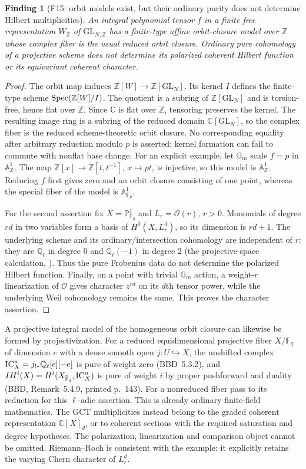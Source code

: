 \documentclass[11pt,a4paper]{article}
\newcommand{\Q}{\mathbb Q}\newcommand{\Z}{\mathbb Z}\newcommand{\C}{\mathbb C}\newcommand{\N}{\mathbb N}\newcommand{\F}{\mathbb F}
\newcommand{\A}{\mathbb A}\newcommand{\PP}{\mathbb P}\newcommand{\GL}{\mathrm{GL}}
\newcommand{\fid}[1]{\textsf{#1}}\newcommand{\gate}[1]{\textsf{#1}}
\theoremstyle{named}\newtheorem{finding}{Finding}[section]
\theoremstyle{definition}\newtheorem{definition}[finding]{Definition}
\theoremstyle{remark}\newtheorem{remark}[finding]{Remark}
\begin{document}
\begin{finding}[\fid{F15}: orbit models exist, but their ordinary purity does not determine Hilbert multiplicities]\label{f:orbit}
An integral polynomial tensor $f$ in a finite free representation $W_\Z$ of $\GL_{N,\Z}$ has a finite-type affine orbit-closure model over $\Z$ whose complex fiber is the usual reduced orbit closure. Ordinary pure cohomology of a projective scheme does not determine its polarized coherent Hilbert function or its equivariant coherent character.
\end{finding}
\begin{proof}
The orbit map induces $\Z[W]\to\Z[\GL_N]$. Its kernel $I$ defines the finite-type scheme $\Spec(\Z[W]/I)$. The quotient is a subring of $\Z[\GL_N]$ and is torsion-free, hence flat over $\Z$. Since $\C$ is flat over $\Z$, tensoring preserves the kernel. The resulting image ring is a subring of the reduced domain $\C[\GL_N]$, so the complex fiber is the reduced scheme-theoretic orbit closure. No corresponding equality after arbitrary reduction modulo $p$ is asserted; kernel formation can fail to commute with nonflat base change. For an explicit example, let $\mathbb G_m$ scale $f=p$ in $\A^1_\Z$. The map $\Z[x]\to\Z[t,t^{-1}]$, $x\mapsto pt$, is injective, so this model is $\A^1_\Z$. Reducing $f$ first gives zero and an orbit closure consisting of one point, whereas the special fiber of the model is $\A^1_{\F_p}$.

For the second assertion fix $X=\PP^1_{\F_q}$ and $L_r=\mathcal O(r)$, $r>0$. Monomials of degree $rd$ in two variables form a basis of $H^0(X,L_r^d)$, so its dimension is $rd+1$. The underlying scheme and its ordinary/intersection cohomology are independent of $r$: they are $\Q_\ell$ in degree 0 and $\Q_\ell(-1)$ in degree 2 (the projective-space calculation, \cite[Example 16.3, p.~109]{Milne}). Thus the pure Frobenius data do not determine the polarized Hilbert function. Finally, on a point with trivial $\mathbb G_m$ action, a weight-$r$ linearization of $\mathcal O$ gives character $z^{rd}$ on its $d$th tensor power, while the underlying Weil cohomology remains the same. This proves the character assertion.
\end{proof}
A projective integral model of the homogeneous orbit closure can likewise be formed by projectivization. For a reduced equidimensional projective fiber $X/\F_q$ of dimension $e$ with a dense smooth open $j:U\hookrightarrow X$, the unshifted complex $\IC_X^u=j_{!*}\Q_\ell[e][-e]$ is pure of weight zero (BBD~5.3.2), and $IH^i(X)=H^i(X_{\bar{\F}_q},\IC_X^u)$ is pure of weight $i$ by proper pushforward and duality (BBD, Remark~5.4.9, printed p.~143). For a nonreduced fiber pass to its reduction for this \(\ell\)-adic assertion. This is already ordinary finite-field mathematics. The GCT multiplicities instead belong to the graded coherent representation $\C[X]_d$, or to coherent sections with the required saturation and degree hypotheses. The polarization, linearization and comparison object cannot be omitted. Riemann--Roch is consistent with the example: it explicitly retains the varying Chern character of $L_r^d$.
\end{document}
